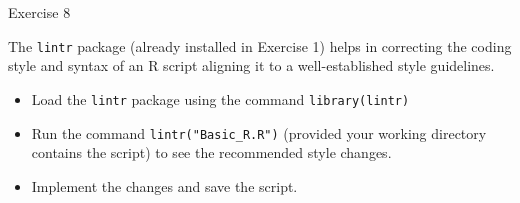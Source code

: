 \documentclass[aspectratio=169]{beamer}
\begin{document}
\begin{frame}{Exercise 8}

    The \texttt{lintr} package (already installed in Exercise 1) helps in correcting the coding style and syntax of an R script aligning it to a well-established style guidelines.
    \begin{itemize}
        \item Load the \texttt{lintr} package using the command \texttt{library(lintr)}
        \item Run the command \texttt{lintr("Basic\_R.R")} (provided your working directory contains the script) to see the recommended style changes.
        \item Implement the changes and save the script.
    \end{itemize}
    
\end{frame}

    
    

    
\end{document}
